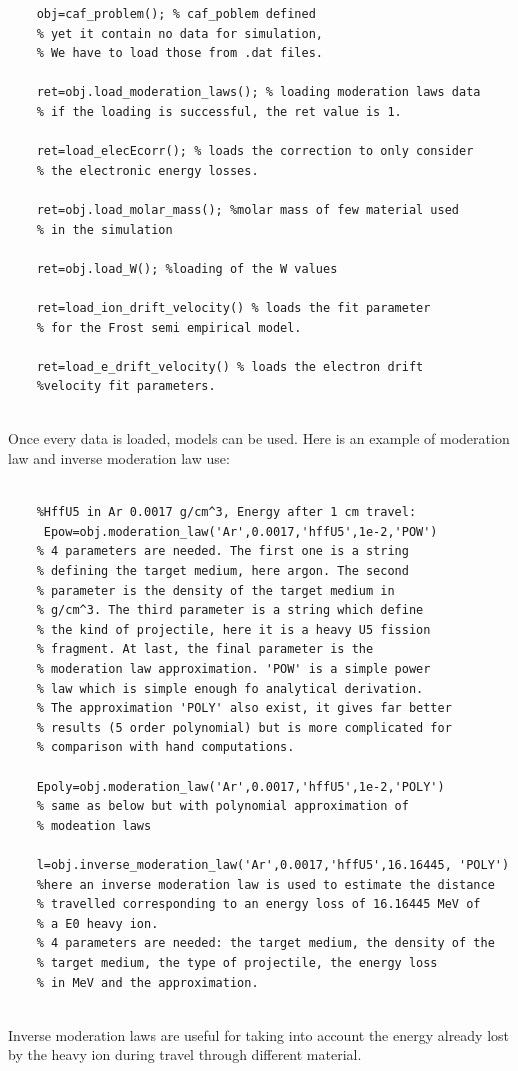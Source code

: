 \documentclass[10pt]{article}
\begin{document}
	\begin{lstlisting}
	obj=caf_problem(); % caf_poblem defined
	% yet it contain no data for simulation,
	% We have to load those from .dat files.
	
	ret=obj.load_moderation_laws(); % loading moderation laws data
	% if the loading is successful, the ret value is 1.
	
	ret=load_elecEcorr(); % loads the correction to only consider
	% the electronic energy losses.
	
	ret=obj.load_molar_mass(); %molar mass of few material used 
	% in the simulation
	
	ret=obj.load_W(); %loading of the W values
	
	ret=load_ion_drift_velocity() % loads the fit parameter
	% for the Frost semi empirical model.
	
	ret=load_e_drift_velocity() % loads the electron drift
	%velocity fit parameters.
		
	\end{lstlisting}
	
	Once every data is loaded, models can be used. Here is an example of moderation law and inverse moderation law use:
	
	\begin{lstlisting}
	
	%HffU5 in Ar 0.0017 g/cm^3, Energy after 1 cm travel:
	 Epow=obj.moderation_law('Ar',0.0017,'hffU5',1e-2,'POW')
	% 4 parameters are needed. The first one is a string
	% defining the target medium, here argon. The second
	% parameter is the density of the target medium in
	% g/cm^3. The third parameter is a string which define
	% the kind of projectile, here it is a heavy U5 fission
	% fragment. At last, the final parameter is the 
	% moderation law approximation. 'POW' is a simple power
	% law which is simple enough fo analytical derivation.
	% The approximation 'POLY' also exist, it gives far better
	% results (5 order polynomial) but is more complicated for
	% comparison with hand computations.
	
	Epoly=obj.moderation_law('Ar',0.0017,'hffU5',1e-2,'POLY')
	% same as below but with polynomial approximation of 
	% modeation laws
	
	l=obj.inverse_moderation_law('Ar',0.0017,'hffU5',16.16445, 'POLY')
	%here an inverse moderation law is used to estimate the distance
	% travelled corresponding to an energy loss of 16.16445 MeV of
	% a E0 heavy ion.
	% 4 parameters are needed: the target medium, the density of the
	% target medium, the type of projectile, the energy loss
	% in MeV and the approximation.
	
	\end{lstlisting}
	Inverse moderation laws are useful for taking into account the energy already lost by the heavy ion during travel through different material.
	
\end{document}
